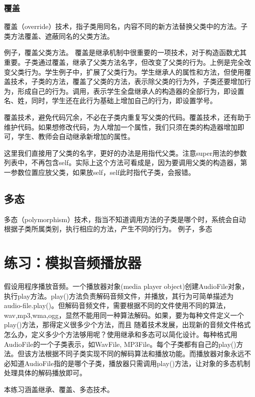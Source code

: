 \subsubsection{覆盖}
覆盖（override）技术，指子类用同名，内容不同的新方法替换父类中的方法。子类方法覆盖、遮蔽同名的父类方法。

例子，覆盖父类方法。
覆盖是继承机制中很重要的一项技术，对于构造函数尤其重要。子类通过覆盖，继承了父类方法名字，但改变了父类的行为。上例是完全改变父类行为。学生例子中，扩展了父类行为。学生继承人的属性和方法，但使用覆盖技术，子类的方法，覆盖了父类的方法，表示除父类的行为外，子类还要增加行为，形成自己的行为。调用，表示学生全盘继承人的构造器的全部行为，即设置名、姓，同时，学生还在此行为基础上增加自己的行为，即设置学号。

覆盖技术，避免代码冗余，不必在子类内重复写父类的代码。覆盖技术，还有助于维护代码。如果想修改代码，为人增加一个属性，我们只须在类的构造器增加即可，学生、教师会自动继承新增加的属性。

这里我们直接用了父类的名字，更好的办法是用指代父类。注意super用法的参数列表中，不再包含self。实际上这个方法可看成是，因为要调用父类的构造器，第一参数位置应放父类，如果放self，self此时指代子类，会报错。
\subsection{多态}
多态（polymorphism）技术，指当不知道调用方法的子类是哪个时，系统会自动根据子类所属类别，执行相应的方法，产生不同的行为。
例子，多态

\section{练习：模拟音频播放器}
假设用程序播放音频。一个播放器对象(media player object)创建AudioFile对象，执行play方法。play()方法负责解码音频文件，并播放，其行为可简单描述为audio-file.play()。但解码音频文件，需要根据不同的文件使用不同的算法，wav,mp3,wma,ogg，显然不能用同一种算法解码。如果，要为每种文件定义一个play()方法，那得定义很多少个方法，而且 随着技术发展，出现新的音频文件格式怎么办，定义多少个方法够用呢？使用继承和多态可以简化设计。每种格式用AudioFile的一个子类表示，如WavFile, MP3File。每个子类都有自己的play()方法。但该方法根据不同子类实现不同的解码算法和播放功能。而播放器对象永远不必知道AudioFile指的是哪个子类，播放器只需调用play()方法，让对象的多态机制处理具体的解码播放即可。

本练习涵盖继承、覆盖、多态技术。
